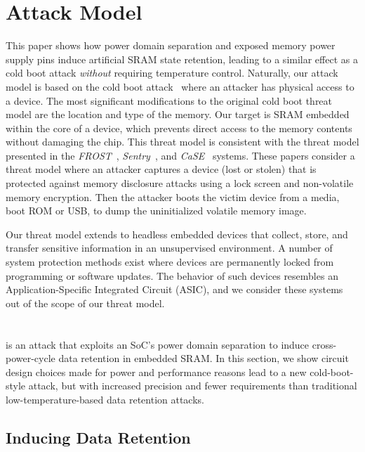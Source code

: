 \section{Attack Model}
\label{sec_attack_model}

This paper shows how power domain separation and exposed memory power supply pins induce artificial SRAM state retention, leading to a similar effect as a cold boot attack \textit{without} requiring temperature control.
Naturally, our attack model is based on the cold boot attack~\cite{halderman2009lest} where an attacker has physical access to a device. 
The most significant modifications to the original cold boot threat model are the location and type of the memory. 
Our target is SRAM embedded within the core of a device, which prevents direct access to the memory contents without damaging the chip.
This threat model is consistent with  the threat model presented in the \textit{FROST}~\cite{frost_2013}, \textit{Sentry}~\cite{Sentry}, and \textit{CaSE}~\cite{zhang2016case} systems. 
These papers consider a threat model where an attacker captures a device (\ie lost or stolen) that is protected against memory disclosure attacks using a lock screen and non-volatile memory encryption.
Then the attacker boots the victim device from a media, \eg boot ROM or USB, to dump the uninitialized volatile memory image. 

Our threat model extends to headless embedded devices that collect, store, and transfer sensitive information in an unsupervised environment.
A number of system protection methods exist where devices are permanently locked from programming or software updates.
The behavior of such devices resembles an Application-Specific Integrated Circuit (ASIC), and we consider these systems out of the scope of our threat model.\section{\sys{}}
\label{sec_attack_over_view}

\sys{} is an attack that exploits an SoC's power domain separation to induce cross-power-cycle data retention in embedded SRAM.
In this section, we show circuit design choices made for power and performance reasons lead to a new cold-boot-style attack, but with increased precision and fewer requirements than traditional low-temperature-based data retention attacks. 

\subsection{Inducing Data Retention}
\label{sec_attack_enabler}

